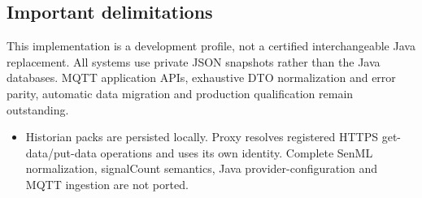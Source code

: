 \documentclass[a4paper]{arrowhead}
\begin{document}
\subsection{Important delimitations}
This implementation is a development profile, not a certified interchangeable Java replacement. All systems use private JSON snapshots rather than the Java databases. MQTT application APIs, exhaustive DTO normalization and error parity, automatic data migration and production qualification remain outstanding.
\begin{itemize}
\item Historian packs are persisted locally. Proxy resolves registered HTTPS get-data/put-data operations and uses its own identity. Complete SenML normalization, signalCount semantics, Java provider-configuration and MQTT ingestion are not ported.
\end{itemize}
\end{document}
